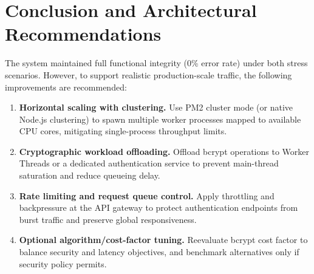 \documentclass[12pt,a4paper]{article}
\begin{document}
\section{Conclusion and Architectural Recommendations}

The system maintained full functional integrity (0\% error rate) under both stress scenarios.
However, to support realistic production-scale traffic, the following improvements are recommended:

\begin{enumerate}[leftmargin=1.5em]
    \item \textbf{Horizontal scaling with clustering.}
    Use PM2 cluster mode (or native Node.js clustering) to spawn multiple worker processes
    mapped to available CPU cores, mitigating single-process throughput limits.

    \item \textbf{Cryptographic workload offloading.}
    Offload bcrypt operations to Worker Threads or a dedicated authentication service to prevent
    main-thread saturation and reduce queueing delay.

    \item \textbf{Rate limiting and request queue control.}
    Apply throttling and backpressure at the API gateway to protect authentication endpoints
    from burst traffic and preserve global responsiveness.

    \item \textbf{Optional algorithm/cost-factor tuning.}
    Reevaluate bcrypt cost factor to balance security and latency objectives, and benchmark
    alternatives only if security policy permits.
\end{enumerate}
\end{document}
